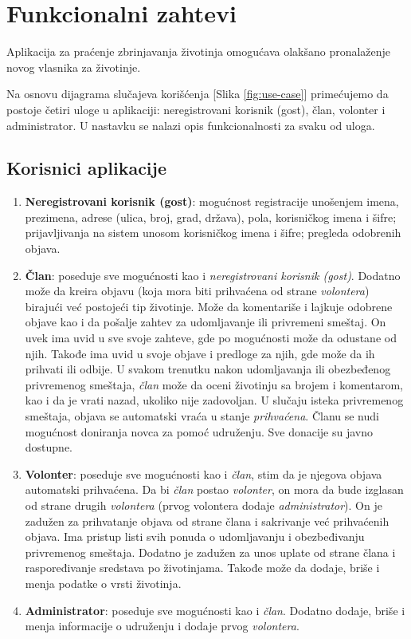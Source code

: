 \section{Funkcionalni zahtevi}
\par Aplikacija za praćenje zbrinjavanja životinja omogućava olakšano pronalaženje novog vlasnika za životinje. 
\par Na osnovu dijagrama slučajeva korišćenja [Slika \ref{fig:use-case}] primećujemo da postoje četiri uloge u aplikaciji: neregistrovani korisnik (gost), član, volonter i administrator. 
U nastavku se nalazi opis funkcionalnosti za svaku od uloga.
\subsection{Korisnici aplikacije}
\begin{enumerate}
    \item \textbf{Neregistrovani korisnik (gost)}: mogućnost registracije unošenjem imena, prezimena, adrese (ulica, broj, grad, država), pola, korisničkog imena i šifre;
    prijavljivanja na sistem unosom korisničkog imena i šifre; pregleda odobrenih objava.
    \item \textbf{Član}: poseduje sve mogućnosti kao i \textit{neregistrovani korisnik (gost)}. Dodatno može da kreira objavu (koja mora biti prihvaćena od strane
    \textit{volontera}) birajući već postojeći tip životinje. Može da komentariše i lajkuje odobrene objave kao i da pošalje zahtev za udomljavanje ili 
    privremeni smeštaj. On uvek ima uvid u sve svoje zahteve, gde po mogućnosti može da odustane od njih. Takođe ima uvid u svoje objave i predloge za njih, gde može da ih prihvati ili odbije. 
    U svakom trenutku nakon udomljavanja ili obezbeđenog privremenog smeštaja, \textit{član} može da oceni životinju sa brojem i komentarom, kao i da je vrati nazad, ukoliko nije zadovoljan. 
    U slučaju isteka privremenog smeštaja, objava se automatski vraća u stanje \textit{prihvaćena}. Članu se nudi mogućnost doniranja novca za pomoć udruženju. Sve donacije su javno dostupne.
    \item \textbf{Volonter}: poseduje sve mogućnosti kao i \textit{član}, stim da je njegova objava automatski prihvaćena. Da bi \textit{član} postao \textit{volonter}, on mora
    da bude izglasan od strane drugih \textit{volontera} (prvog volontera dodaje \textit{administrator}). On je zadužen za prihvatanje objava od strane člana i sakrivanje već 
    prihvaćenih objava. Ima pristup listi svih ponuda o udomljavanju i obezbeđivanju privremenog smeštaja. Dodatno je zadužen za unos uplate od 
    strane člana i raspoređivanje sredstava po životinjama. Takođe može da dodaje, briše i menja podatke o vrsti životinja. 
    \item \textbf{Administrator}: poseduje sve mogućnosti kao i \textit{član}. Dodatno dodaje, briše i menja informacije o udruženju i dodaje prvog \textit{volontera}.
\end{enumerate}